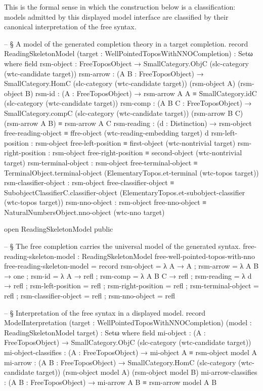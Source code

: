 \documentclass[11pt]{article}
\begin{document}
This is the formal sense in which the construction below is a
classification: models admitted by this displayed model interface are
classified by their canonical interpretation of the free syntax.

\begin{code}

-- § A model of the generated completion theory in a target completion.
record ReadingSkeletonModel
  (target : WellPointedToposWithNNOCompletion) : Setω where
  field
    rsm-object :
      FreeToposObject →
      SmallCategory.ObjC (slc-category (wtc-candidate target))
    rsm-arrow :
      (A B : FreeToposObject) →
      SmallCategory.HomC
        (slc-category (wtc-candidate target))
        (rsm-object A)
        (rsm-object B)
    rsm-id :
      (A : FreeToposObject) →
      rsm-arrow A A ≡
      SmallCategory.idC (slc-category (wtc-candidate target))
    rsm-comp :
      (A B C : FreeToposObject) →
      SmallCategory.compC
        (slc-category (wtc-candidate target))
        (rsm-arrow B C)
        (rsm-arrow A B) ≡
      rsm-arrow A C
    rsm-reading :
      (d : Distinction) →
      rsm-object free-reading-object ≡
      ffre-object (wtc-reading-embedding target) d
    rsm-left-position :
      rsm-object free-left-position ≡
      first-object (wtc-nontrivial target)
    rsm-right-position :
      rsm-object free-right-position ≡
      second-object (wtc-nontrivial target)
    rsm-terminal-object :
      rsm-object free-terminal-object ≡
      TerminalObject.terminal-object
        (ElementaryTopos.et-terminal (wtc-topos target))
    rsm-classifier-object :
      rsm-object free-classifier-object ≡
      SubobjectClassifierC.classifier-object
        (ElementaryTopos.et-subobject-classifier (wtc-topos target))
    rsm-nno-object :
      rsm-object free-nno-object ≡
      NaturalNumbersObject.nno-object (wtc-nno target)

open ReadingSkeletonModel public

-- § The free completion carries the universal model of the generated syntax.
free-reading-skeleton-model :
  ReadingSkeletonModel free-well-pointed-topos-with-nno
free-reading-skeleton-model = record
  { rsm-object = λ A → A
  ; rsm-arrow = λ A B → one
  ; rsm-id = λ A → refl
  ; rsm-comp = λ A B C → refl
  ; rsm-reading = λ d → refl
  ; rsm-left-position = refl
  ; rsm-right-position = refl
  ; rsm-terminal-object = refl
  ; rsm-classifier-object = refl
  ; rsm-nno-object = refl
  }

-- § Interpretation of the free syntax in a displayed model.
record ModelInterpretation
  (target : WellPointedToposWithNNOCompletion)
  (model : ReadingSkeletonModel target) : Setω where
  field
    mi-object :
      (A : FreeToposObject) →
      SmallCategory.ObjC (slc-category (wtc-candidate target))
    mi-object-classifies :
      (A : FreeToposObject) →
      mi-object A ≡ rsm-object model A
    mi-arrow :
      (A B : FreeToposObject) →
      SmallCategory.HomC
        (slc-category (wtc-candidate target))
        (rsm-object model A)
        (rsm-object model B)
    mi-arrow-classifies :
      (A B : FreeToposObject) →
      mi-arrow A B ≡ rsm-arrow model A B


\end{code}
\end{document}

